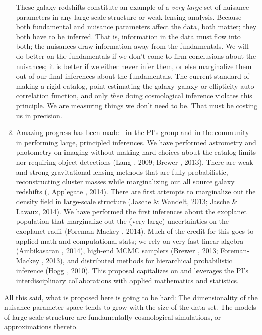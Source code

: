 \documentclass[12pt]{article}
\begin{document}
\begin{enumerate}
These galaxy redshifts constitute an example of a \emph{very large}
set of nuisance parameters in any large-scale structure or
weak-lensing analysis.
Because both fundamental and nuisance parameters affect the data, both
matter; they both have to be inferred.
That is, information in the data must flow into both; the nuisances
draw information away from the fundamentals.
We will do better on the fundamentals if we don't come to firm
conclusions about the nuisances; it is better if we either never infer
them, or else marginalize them out of our final inferences about the
fundamentals.
The current standard of making a rigid catalog, point-estimating the
galaxy--galaxy or ellipticity auto-correlation function, and only
\emph{then} doing cosmological inference violates this principle.
We are measuring things we don't need to be.
That must be costing us in precision.
\item
Amazing progress has been made---in the PI's group and in the
community---in performing large, principled inferences.
We have performed astrometry and photometry on imaging without making
hard choices about the catalog limits nor requiring object detections
(Lang \etal, 2009; Brewer \etal, 2013).
There are weak and strong gravitational lensing methods that are fully
probabilistic, reconstructing cluster masses while marginalizing out
all source galaxy redshifts (\eg, Applegate \etal, 2014).
There are first attempts to marginalize out the density field in
large-scale structure (Jasche \& Wandelt, 2013; Jasche \& Lavaux, 2014).
We have performed the first inferences about the exoplanet population
that marginalize out the (very large) uncertainties on the exoplanet
radii (Foreman-Mackey \etal, 2014).
Much of the credit for this goes to applied math and computational
stats; we rely on very fast linear algebra (Ambikasaran \etal, 2014), high-end MCMC
samplers (Brewer \etal, 2013; Foreman-Mackey \etal, 2013), and distributed methods
for hierarchical probabilistic inference (Hogg \etal, 2010).
This proposal capitalizes on and leverages the PI's interdisciplinary
collaborations with applied mathematics and statistics.
\end{enumerate}

All this said, what is proposed here is going to be hard:
The dimensionality of the nuisance parameter space tends to grow with
the size of the data set.
The models of large-scale structure are fundamentally cosmological
simulations, or approximations thereto.
\end{document}
